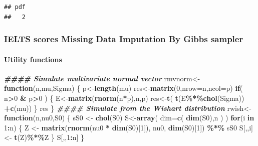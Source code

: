 \documentclass[12pt]{article}
\newenvironment{Shaded}{\begin{snugshade}}{\end{snugshade}}
\newcommand{\AttributeTok}[1]{\textcolor[rgb]{0.13,0.29,0.53}{#1}}
\newcommand{\ControlFlowTok}[1]{\textcolor[rgb]{0.13,0.29,0.53}{\textbf{#1}}}
\newcommand{\DecValTok}[1]{\textcolor[rgb]{0.00,0.00,0.81}{#1}}
\newcommand{\DocumentationTok}[1]{\textcolor[rgb]{0.56,0.35,0.01}{\textbf{\textit{#1}}}}
\newcommand{\FunctionTok}[1]{\textcolor[rgb]{0.13,0.29,0.53}{\textbf{#1}}}
\newcommand{\NormalTok}[1]{#1}
\newcommand{\OtherTok}[1]{\textcolor[rgb]{0.56,0.35,0.01}{#1}}
\newcommand{\SpecialCharTok}[1]{\textcolor[rgb]{0.81,0.36,0.00}{\textbf{#1}}}
\begin{document}
\begin{verbatim}
## pdf 
##   2
\end{verbatim}

\subsubsection{IELTS scores Missing Data Imputation By Gibbs
sampler}\label{ielts-scores-missing-data-imputation-by-gibbs-sampler}

\paragraph{Utility functions}\label{utility-functions}

\begin{Shaded}
\begin{Highlighting}[]
\DocumentationTok{\#\#\#\# Simulate multivariate normal vector}
\NormalTok{rmvnorm}\OtherTok{\textless{}{-}}
\ControlFlowTok{function}\NormalTok{(n,mu,Sigma) \{}
\NormalTok{  p}\OtherTok{\textless{}{-}}\FunctionTok{length}\NormalTok{(mu)}
\NormalTok{  res}\OtherTok{\textless{}{-}}\FunctionTok{matrix}\NormalTok{(}\DecValTok{0}\NormalTok{,}\AttributeTok{nrow=}\NormalTok{n,}\AttributeTok{ncol=}\NormalTok{p)}
  \ControlFlowTok{if}\NormalTok{( n}\SpecialCharTok{\textgreater{}}\DecValTok{0} \SpecialCharTok{\&}\NormalTok{ p}\SpecialCharTok{\textgreater{}}\DecValTok{0}\NormalTok{ ) \{}
\NormalTok{  E}\OtherTok{\textless{}{-}}\FunctionTok{matrix}\NormalTok{(}\FunctionTok{rnorm}\NormalTok{(n}\SpecialCharTok{*}\NormalTok{p),n,p)}
\NormalTok{  res}\OtherTok{\textless{}{-}}\FunctionTok{t}\NormalTok{(  }\FunctionTok{t}\NormalTok{(E}\SpecialCharTok{\%*\%}\FunctionTok{chol}\NormalTok{(Sigma)) }\SpecialCharTok{+}\FunctionTok{c}\NormalTok{(mu))}
\NormalTok{                   \}}
\NormalTok{  res}
\NormalTok{                       \}}
\DocumentationTok{\#\#\#\# Simulate from the Wishart distribution}
\NormalTok{rwish}\OtherTok{\textless{}{-}}\ControlFlowTok{function}\NormalTok{(n,nu0,S0)}
\NormalTok{\{}
\NormalTok{  sS0 }\OtherTok{\textless{}{-}} \FunctionTok{chol}\NormalTok{(S0)}
\NormalTok{  S}\OtherTok{\textless{}{-}}\FunctionTok{array}\NormalTok{( }\AttributeTok{dim=}\FunctionTok{c}\NormalTok{( }\FunctionTok{dim}\NormalTok{(S0),n ) )}
  \ControlFlowTok{for}\NormalTok{(i }\ControlFlowTok{in} \DecValTok{1}\SpecialCharTok{:}\NormalTok{n)}
\NormalTok{  \{}
\NormalTok{     Z }\OtherTok{\textless{}{-}} \FunctionTok{matrix}\NormalTok{(}\FunctionTok{rnorm}\NormalTok{(nu0 }\SpecialCharTok{*} \FunctionTok{dim}\NormalTok{(S0)[}\DecValTok{1}\NormalTok{]), nu0, }\FunctionTok{dim}\NormalTok{(S0)[}\DecValTok{1}\NormalTok{]) }\SpecialCharTok{\%*\%}\NormalTok{ sS0}
\NormalTok{     S[,,i]}\OtherTok{\textless{}{-}} \FunctionTok{t}\NormalTok{(Z)}\SpecialCharTok{\%*\%}\NormalTok{Z}
\NormalTok{  \}}
\NormalTok{  S[,,}\DecValTok{1}\SpecialCharTok{:}\NormalTok{n]}
\NormalTok{\}}
\end{Highlighting}
\end{Shaded}
\end{document}
